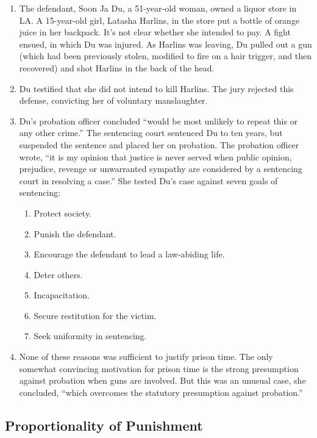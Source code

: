 \begin{enumerate}

    \item The defendant, Soon Ja Du, a 51-year-old woman, owned a liquor store in LA. A 15-year-old girl, Latasha Harlins, in the store put a bottle of orange juice in her backpack. It's not clear whether she intended to pay. A fight ensued, in which Du was injured. As Harlins was leaving, Du pulled out a gun (which had been previously stolen, modified to fire on a hair trigger, and then recovered) and shot Harlins in the back of the head.
    \item Du testified that she did not intend to kill Harlins. The jury rejected this defense, convicting her of voluntary manslaughter.
    \item Du's probation officer concluded ``would be most unlikely to repeat this or any other crime.'' The sentencing court sentenced Du to ten years, but suspended the sentence and placed her on probation. The probation officer wrote, ``it is my opinion that justice is never served when public opinion, prejudice, revenge or unwarranted sympathy are considered by a sentencing court in resolving a case.'' She tested Du's case against seven goals of sentencing:
    \begin{enumerate}
        \item Protect society.
        \item Punish the defendant.
        \item Encourage the defendant to lead a law-abiding life.
        \item Deter others.
        \item Incapacitation.
        \item Secure restitution for the victim.
        \item Seek uniformity in sentencing.
    \end{enumerate}
    \item None of these reasons was sufficient to justify prison time. The only somewhat convincing motivation for prison time is the strong presumption against probation when guns are involved. But this was an unusual case, she concluded, ``which overcomes the statutory presumption against probation.''
\end{enumerate}

\subsection{Proportionality of Punishment}

